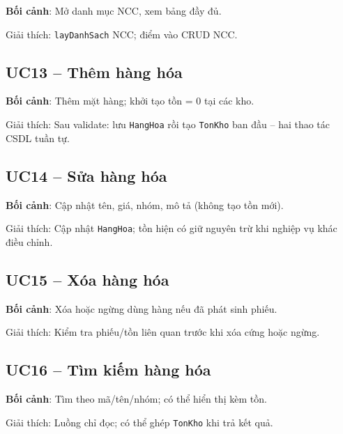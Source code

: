 \textbf{Bối cảnh}: Mở danh mục NCC, xem bảng đầy đủ.



Giải thích: \texttt{layDanhSach} NCC; điểm vào CRUD NCC.

\subsection{UC13 -- Thêm hàng hóa}

\textbf{Bối cảnh}: Thêm mặt hàng; khởi tạo tồn = 0 tại các kho.



Giải thích: Sau validate: lưu \texttt{HangHoa} rồi tạo \texttt{TonKho} ban đầu -- hai thao tác CSDL tuần tự.

\subsection{UC14 -- Sửa hàng hóa}

\textbf{Bối cảnh}: Cập nhật tên, giá, nhóm, mô tả (không tạo tồn mới).



Giải thích: Cập nhật \texttt{HangHoa}; tồn hiện có giữ nguyên trừ khi nghiệp vụ khác điều chỉnh.

\subsection{UC15 -- Xóa hàng hóa}

\textbf{Bối cảnh}: Xóa hoặc ngừng dùng hàng nếu đã phát sinh phiếu.



Giải thích: Kiểm tra phiếu/tồn liên quan trước khi xóa cứng hoặc ngừng.

\subsection{UC16 -- Tìm kiếm hàng hóa}

\textbf{Bối cảnh}: Tìm theo mã/tên/nhóm; có thể hiển thị kèm tồn.



Giải thích: Luồng chỉ đọc; có thể ghép \texttt{TonKho} khi trả kết quả.

